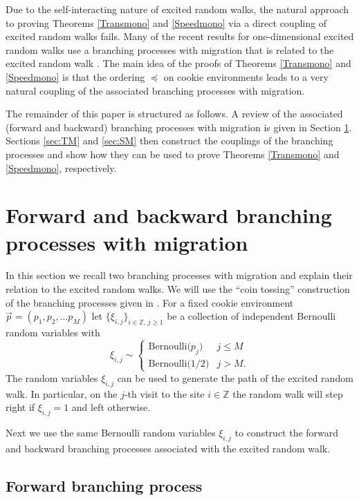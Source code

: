 \documentclass[reqno,letterpaper,11pt]{amsart}
\theoremstyle{remark}
\theoremstyle{definition}
\begin{document}
Due to the self-interacting nature of excited random walks, the natural approach to proving Theorems \ref{Transmono} and \ref{Speedmono} via a direct coupling of excited random walks fails. 
Many of the recent results for one-dimensional excited random walks use a branching processes with migration that is related to the excited random walk \cite{bsCRWspeed,bsRGCRW,kzPNERW,kmLLCRW,rrMOTERW,dkSLRERW,pLDSERW}. 
The main idea of the proofs of Theorems \ref{Transmono} and \ref{Speedmono} is that the ordering ${\preccurlyeq}$ on cookie environments leads to a very natural coupling of the associated branching processes with migration. 

The remainder of this paper is structured as follows. 
A review of the associated (forward and backward) branching processes with migration is given in Section \ref{sec:BPWM}. Sections \ref{sec:TM} and \ref{sec:SM} then construct the couplings of the branching processes and show how they can be used to prove Theorems \ref{Transmono} and \ref{Speedmono}, respectively. 

\section{Forward and backward branching processes with migration} \label{sec:BPWM}

In this section we recall two branching processes with migration and explain their relation to the excited random walks. 
We will use the ``coin tossing'' construction of the branching processes given in \cite{kzPNERW}. For a fixed cookie environment ${\vec{p}}=(p_1,p_2,\ldots p_M)$ let $\{ \xi_{i,j} \}_{i \in {\mathbb Z}, \, j\geq 1}$ be a collection of independent Bernoulli random variables with 
\[
 \xi_{i,j} \sim
\begin{cases}
 \text{Bernoulli($p_j$)} & j \leq M \\
 \text{Bernoulli($1/2$)} & j > M. 
\end{cases}
\]
The random variables $\xi_{i,j}$ can be used to generate the path of the excited random walk. In particular, on the $j$-th visit to the site $i\in {\mathbb Z}$ the random walk will step right if $\xi_{i,j} = 1$ and left otherwise. 

Next we use the same Bernoulli random variables $\xi_{i,j}$ to construct the forward and backward branching processes associated with the excited random walk.

\subsection{Forward branching process}
\end{document}
